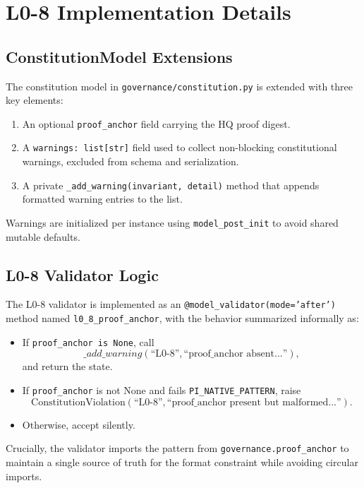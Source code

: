\documentclass[11pt]{article}
\begin{document}

\section{L0-8 Implementation Details}

\subsection{ConstitutionModel Extensions}

The constitution model in \texttt{governance/constitution.py} is extended with three key elements:\cite{cite:40,cite:41}
\begin{enumerate}[nosep]
  \item An optional \texttt{proof\_anchor} field carrying the HQ proof digest.
  \item A \texttt{warnings: list[str]} field used to collect non-blocking constitutional warnings, excluded from schema and serialization.
  \item A private \texttt{\_add\_warning(invariant, detail)} method that appends formatted warning entries to the list.
\end{enumerate}
Warnings are initialized per instance using \texttt{model\_post\_init} to avoid shared mutable defaults.\cite{cite:41}

\subsection{L0-8 Validator Logic}

The L0-8 validator is implemented as an \texttt{@model\_validator(mode='after')} method named \texttt{l0\_8\_proof\_anchor}, with the behavior summarized informally as:\cite{cite:41}
\begin{itemize}[nosep]
  \item If \texttt{proof\_anchor is None}, call
  \[
    \_add\_warning(\text{``L0-8''}, \text{``proof\_anchor absent...''}),
  \]
  and return the state.
  \item If \texttt{proof\_anchor} is not None and fails \texttt{PI\_NATIVE\_PATTERN}, raise
  \[
    \mathrm{ConstitutionViolation}(\text{``L0-8''}, \text{``proof\_anchor present but malformed...''}).
  \]
  \item Otherwise, accept silently.
\end{itemize}
Crucially, the validator imports the pattern from \texttt{governance.proof\_anchor} to maintain a single source of truth for the format constraint while avoiding circular imports.\cite{cite:41}
\end{document}
